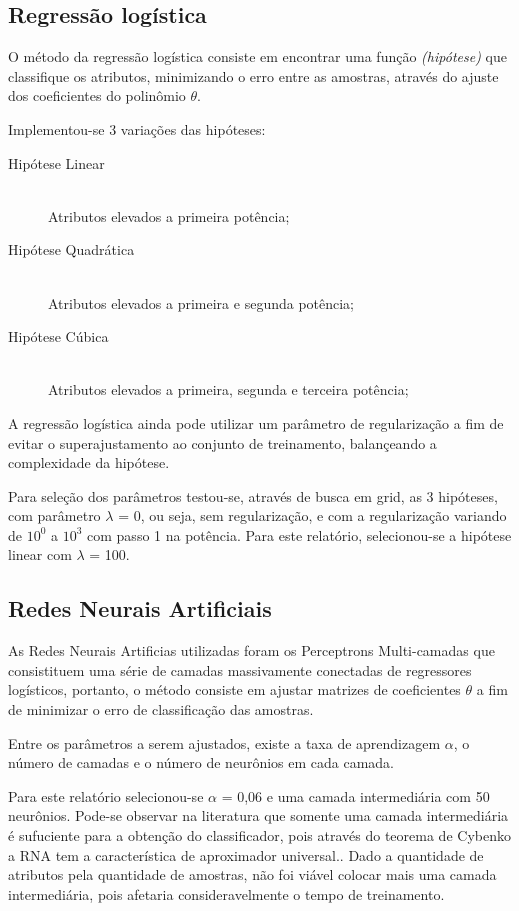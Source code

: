\subsection{Regressão logística}

O método da regressão logística consiste em encontrar uma função \emph{(hipótese)} que classifique os atributos, minimizando o erro entre as amostras, através do ajuste dos coeficientes do polinômio \(\theta\).

Implementou-se 3 variações das hipóteses:

\begin{description}
\item[Hipótese Linear] \hfill \\ Atributos elevados a primeira potência;
\item[Hipótese Quadrática] \hfill \\ Atributos elevados a primeira e segunda potência;
\item[Hipótese Cúbica] \hfill \\ Atributos elevados a primeira, segunda e terceira potência;
\end{description}

A regressão logística ainda pode utilizar um parâmetro de regularização a fim de evitar o superajustamento ao conjunto de treinamento, balançeando a complexidade da hipótese.

Para seleção dos parâmetros testou-se, através de busca em grid, as 3 hipóteses, com parâmetro \(\lambda\) = 0, ou seja, sem regularização, e com a regularização variando de \(10^0\) a \(10^3\) com passo 1 na potência. Para este relatório, selecionou-se a hipótese linear com \(\lambda\) = 100.

\subsection{Redes Neurais Artificiais}

As Redes Neurais Artificias utilizadas foram os Perceptrons Multi-camadas que consistituem uma série de camadas massivamente conectadas de regressores logísticos, portanto, o método consiste em ajustar matrizes de coeficientes \(\theta\) a fim de minimizar o erro de classificação das amostras.

Entre os parâmetros a serem ajustados, existe a taxa de aprendizagem \(\alpha\), o número de camadas e o número de neurônios em cada camada.

Para este relatório selecionou-se \(\alpha\) = 0,06 e uma camada intermediária com 50 neurônios. Pode-se observar na literatura que somente uma camada intermediária é sufuciente para a obtenção do classificador, pois através do teorema de Cybenko a RNA tem a característica de aproximador universal.\cite{cybenko}. Dado a quantidade de atributos pela quantidade de amostras, não foi viável colocar mais uma camada intermediária, pois afetaria consideravelmente o tempo de treinamento.

